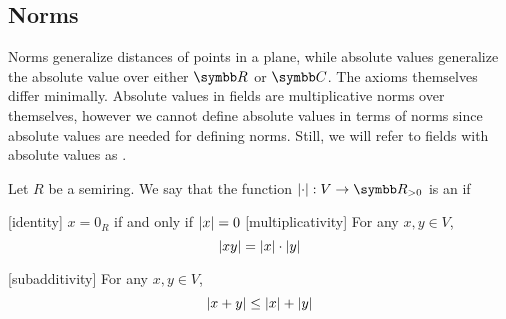 \subsection{Norms}\label{subsec:norms}

\begin{remark}\label{remark:normed_fields}
  Norms generalize distances of points in a plane, while absolute values generalize the absolute value over either \( \R \) or \( \C \). The axioms themselves differ minimally. Absolute values in fields are multiplicative norms over themselves, however we cannot define absolute values in terms of norms since absolute values are needed for defining norms. Still, we will refer to fields with absolute values as .
\end{remark}

\begin{definition}\label{def:absolute_value}\cite{nLab:absolute_value}
  Let \( R \) be a semiring. We say that the function \( \Abs{\cdot}: V \to \R_{>0} \) is an  if
  \begin{description}
    [identity] \( x = 0_R \) if and only if \( \left\vert x \right\vert = 0 \)
    [multiplicativity] For any \( x, y \in V \),
    \begin{equation*}
      \left\vert xy \right\vert = \left\vert x \right\vert \cdot \left\vert y \right\vert
    \end{equation*}

    [subadditivity] For any \( x, y \in V \),
    \begin{equation*}
      \left\vert x + y \right\vert \leq \left\vert x \right\vert + \left\vert y \right\vert
    \end{equation*}
  \end{description}
\end{definition}

